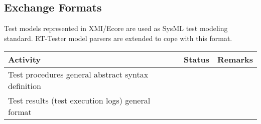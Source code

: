 \documentclass[11pt, a4paper]{article}
\begin{document}
\subsection{Exchange Formats}
Test models represented in XMI/Ecore are used as SysML test modeling
standard. RT-Tester model parsers are extended to cope with this
format.

\begin{tabular}{p{}cp{}}\toprule
Activity & Status & Remarks \\\midrule
Test procedures general abstract syntax definition &&\\\midrule
Test results (test execution logs) general format &&\\
\bottomrule
\end{tabular}


 
\end{document}
